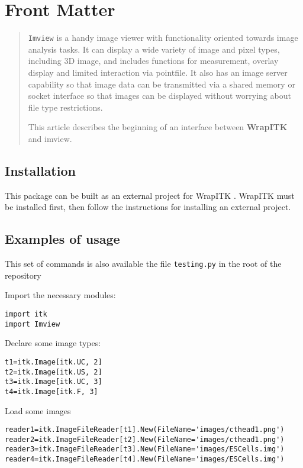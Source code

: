 \documentclass{InsightArticle}
\title{}
\author{Richard Beare}
\begin{document}
\maketitle

\ifhtml
\chapter*{Front Matter\label{front}}
\fi


\begin{abstract}
\noindent
{\tt Imview}\cite{imview} is a handy image viewer with functionality oriented
towards image analysis tasks. It can display a wide variety of image
and pixel types, including 3D image, and includes functions for
measurement, overlay display and limited interaction via pointfile. It
also has an image server capability so that image data can be
transmitted via a shared memory or socket interface so that images can
be displayed without worrying about file type restrictions.

This article describes the beginning of an interface between {\bf
WrapITK} and imview.
\end{abstract}

\tableofcontents

\section{Installation}
This package can be built as an external project for WrapITK
\cite{WrapITK}. WrapITK must be installed first, then follow 
the instructions for installing an external project.

\section{Examples of usage}
This set of commands is also available the file {\tt testing.py} in the root of the repository

Import the necessary modules:
\begin{verbatim}
import itk
import Imview
\end{verbatim}


Declare some image types:
\begin{verbatim}
t1=itk.Image[itk.UC, 2]
t2=itk.Image[itk.US, 2]
t3=itk.Image[itk.UC, 3]
t4=itk.Image[itk.F, 3]
\end{verbatim}

Load some images
\begin{verbatim}
reader1=itk.ImageFileReader[t1].New(FileName='images/cthead1.png')
reader2=itk.ImageFileReader[t2].New(FileName='images/cthead1.png')
reader3=itk.ImageFileReader[t3].New(FileName='images/ESCells.img')
reader4=itk.ImageFileReader[t4].New(FileName='images/ESCells.img')
\end{verbatim}
\end{document}
